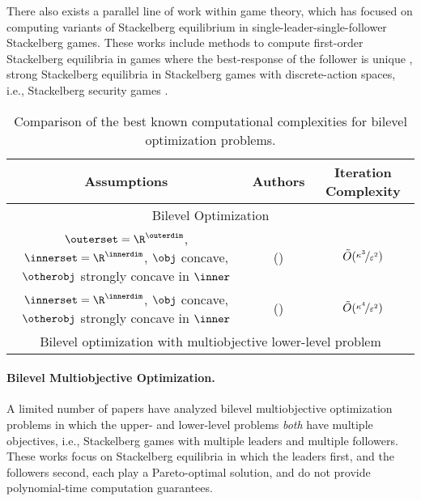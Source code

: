 There also exists a parallel line of work within game theory, which has focused on computing variants of Stackelberg equilibrium in single-leader-single-follower Stackelberg games.
These works include methods to compute first-order Stackelberg equilibria in games where the best-response of the follower is  unique \cite{fiez2019convergence, fiez2020implicit}, strong Stackelberg equilibria in Stackelberg games with discrete-action spaces, i.e., Stackelberg security games \cite{an2011refinement, sinha2018stackelberg, an2017stackelberg, blum2019computing, conitzer2006computing, gan2018stackelberg}.

\begin{table}
\renewcommand{\arraystretch}{1.3}
    \centering
    \begin{tabular}{|c|c|c|}
    \hline Assumptions & Authors & Iteration Complexity \\
    \hline
    \multicolumn{3}{|c|}{Bilevel Optimization}\\
    \hline \hline 
    $\outerset = \R^\outerdim$, $\innerset = \R^\innerdim$, $\obj$ concave, $\otherobj$ strongly concave in $\inner$ & \citeauthor{ghadimi2018approximation} (\citeyear{ghadimi2018approximation}) & $\tilde{O}(\nicefrac{\kappa^3}{\varepsilon^2})$ \\
    \hline
    $\innerset = \R^\innerdim$, $\obj$ concave, $\otherobj$ strongly concave in $\inner$ & \citeauthor{ji2021bilevel} (\citeyear{ji2021bilevel}) & $\tilde{O}(\nicefrac{\kappa^4}{\varepsilon^2})$ \\
    \hline
    \hline
    \multicolumn{3}{|c|}{Bilevel optimization with multiobjective lower-level problem}\\
    \hline
    \hline
\end{tabular}
    \caption{Comparison of the best known computational complexities for bilevel optimization problems.}
    \label{tab:my_label}
\end{table}


\paragraph{Bilevel Multiobjective Optimization.}
A limited number of papers \cite{sinha2015multi, deb2009multi, ji2018multiobjective} have analyzed bilevel multiobjective optimization problems in which the upper- and lower-level problems \emph{both\/} have multiple objectives, i.e., Stackelberg games with multiple leaders and multiple followers.
These works focus on Stackelberg equilibria in which the leaders first, and the followers second, each play a Pareto-optimal solution, and do not provide polynomial-time computation guarantees. 

